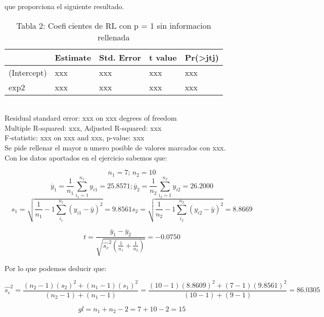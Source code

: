 \documentclass[12pt,spanish]{article}
\begin{document}
que proporciona el siguiente resultado.

\begin{table}[]
\begin{tabular}{@{}lllll@{}}
\toprule
            & Estimate & Std. Error & t value & Pr(\textgreater jtj) \\ \midrule
(Intercept) & xxx      & xxx        & xxx     & xxx                  \\
exp2        & xxx      & xxx        & xxx     & xxx                  \\ \bottomrule
\end{tabular}
\caption{Tabla 2: Coeficientes de RL con p = 1 sin informacion rellenada}
\end{table}
\\
Residual standard error: xxx on xxx degrees of freedom \\
Multiple R-squared: xxx, Adjusted R-squared: xxx \\
F-statistic: xxx on xxx and xxx, p-value: xxx \\
Se pide rellenar el mayor numero posible de valores marcados con xxx. \\

Con los datos aportados en el ejercicio sabemos que:

\[

 n_1 = 7; \,  n_2 = 10
 \]
 \[

 \overline{y}_1 = \frac{1}{n_1}\sum\limits_{i_1 = 1}^{n_1} {y_{i1} } = 25.8571; %
  \overline{y}_2 = \frac{1}{n_2}\sum\limits_{i_2 = 1}^{n_2} {y_{i2} } = 26.2000
  \]
\[

s_1  = \sqrt {\frac{1}{n_1}-1\sum\limits_{i_1}^{n_1} {\left( {y_{i1}  - \bar y} \right)^2 } } = 9.8561

s_2  = \sqrt {\frac{1}{n_2}-1\sum\limits_{i_2}^{n_2} {\left( {y_{i2}  - \bar y} \right)^2 } } = 8.8669 
\]

\[

t = \displaystyle\frac{\overline{y}_1 - \overline{y}_2}{ \sqrt {\hat{s_c}^2 \left(\frac{1}{n_1}+\frac{1}{n_2} \right)}} = -0.0750
\]

Por lo que podemos deducir que:
 
 \[
\hat{s_c}^2 = \frac{\left( n_2 - 1\right) \left( s_2 \right)^2 + \left(n_1 - 1\right)\left( s_1 \right)^2 }{\left(n_2 - 1\right)+ \left(n_1 - 1\right)} = 
 \frac{\left(10 - 1\right) \left( 8.8609 \right)^2 + \left(7 - 1\right)\left( 9.8561 \right)^2 }{\left(10 - 1\right)+ \left(9 - 1\right)} = 86.0305
\]

 \[
 gl = n_1+ n_2-2 = 7 + 10 - 2 = 15
\]
\end{document}
